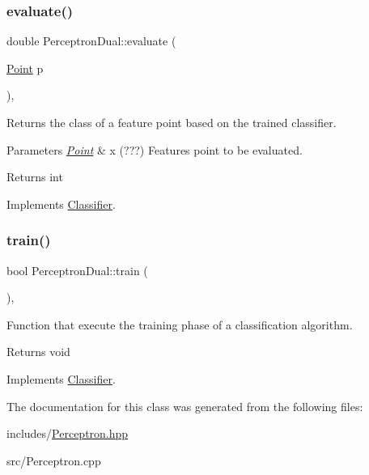 \subsubsection{\texorpdfstring{evaluate()}{evaluate()}}
{\footnotesize\ttfamily double Perceptron\+Dual\+::evaluate (\begin{DoxyParamCaption}\item[{\hyperlink{class_point}{Point}}]{p }\end{DoxyParamCaption})\hspace{0.3cm}{\ttfamily [override]}, {\ttfamily [virtual]}}



Returns the class of a feature point based on the trained classifier. 


\begin{DoxyParams}{Parameters}
{\em \hyperlink{class_point}{Point}} & x (???) Features point to be evaluated. \\
\hline
\end{DoxyParams}
\begin{DoxyReturn}{Returns}
int 
\end{DoxyReturn}


Implements \hyperlink{class_classifier_ae8e9554823b85ddc2dcad2955da811d9}{Classifier}.

\mbox{\label{class_perceptron_dual_a67acd9361cba43bbe2d682c4acd4ecaf}} 
\subsubsection{\texorpdfstring{train()}{train()}}
{\footnotesize\ttfamily bool Perceptron\+Dual\+::train (\begin{DoxyParamCaption}{ }\end{DoxyParamCaption})\hspace{0.3cm}{\ttfamily [override]}, {\ttfamily [virtual]}}



Function that execute the training phase of a classification algorithm. 

\begin{DoxyReturn}{Returns}
void 
\end{DoxyReturn}


Implements \hyperlink{class_classifier_a2306a5de27555ab093593ac9642bc7d9}{Classifier}.



The documentation for this class was generated from the following files\+:\begin{DoxyCompactItemize}
\item 
includes/\hyperlink{_perceptron_8hpp}{Perceptron.\+hpp}\item 
src/Perceptron.\+cpp\end{DoxyCompactItemize}
